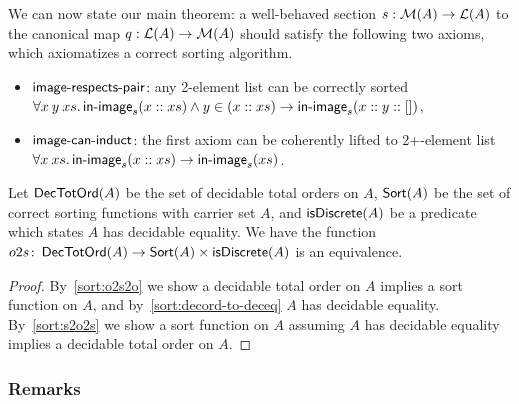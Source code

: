 We can now state our main theorem: a well-behaved section $s : \mathcal{M}(A) \to \mathcal{L}(A)$ to
the canonical map $q : \mathcal{L}(A) \to \mathcal{M}(A)$ should satisfy the following two axioms,
which axiomatizes a correct sorting algorithm.
\begin{definition}
    \leavevmode
    \begin{itemize}[leftmargin=*]
        \item $\operatorname{\mathsf{image-respects-pair}}$: any 2-element list can be correctly sorted\\
              \(
              \forall x \: y \: xs. \operatorname{\mathsf{in-image}}_s(x :: xs) \land y \in (x :: xs) \to \operatorname{\mathsf{in-image}}_s(x :: y :: [])
              \),
        \item $\operatorname{\mathsf{image-can-induct}}$: the first axiom can be coherently lifted to 2+-element list\\
              \(
              \forall x \: xs. \operatorname{\mathsf{in-image}}_s(x :: xs) \to \operatorname{\mathsf{in-image}}_s(xs)
              \).
    \end{itemize}
\end{definition}
\begin{theorem}\label{sort:main}
    Let $\operatorname{\mathsf{DecTotOrd}}(A)$ be the set of decidable total orders on $A$,
    $\operatorname{\mathsf{Sort}}(A)$ be the set of correct sorting functions with carrier set $A$,
    and $\operatorname{\mathsf{isDiscrete}}(A)$ be a predicate which states $A$ has decidable equality.
    We have the function $o2s \colon \operatorname{\mathsf{DecTotOrd}}(A) \to \operatorname{\mathsf{Sort}}(A) \times \operatorname{\mathsf{isDiscrete}}(A)$
    is an equivalence.
\end{theorem}
\begin{proof}
    By~\cref{sort:o2s2o} we show a decidable total order on $A$ implies a sort function
    on $A$, and by~\cref{sort:decord-to-deceq} $A$ has decidable equality.
    By~\cref{sort:s2o2s} we show a sort function on $A$ assuming $A$ has decidable equality
    implies a decidable total order on $A$.
\end{proof}

\subsubsection*{Remarks}

